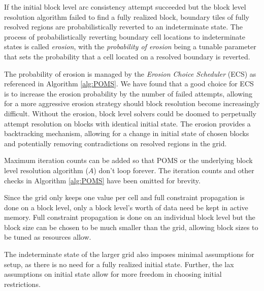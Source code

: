If the initial block level arc consistency attempt succeeded but the block level resolution
algorithm failed to find a fully realized block,
boundary tiles of fully resolved regions are probabilistically reverted to an indeterminate state.
The process of probabilistically reverting boundary cell locations to indeterminate states is called \textit{erosion},
with the \textit{probability of erosion} being a tunable parameter that sets the probability that a cell located on a resolved boundary
is reverted.

The probability of erosion is managed by the \textit{Erosion Choice Scheduler} (ECS) as referenced in Algorithm \ref{alg:POMS}.
We have found that a good choice for ECS is to increase the erosion probability by the number of failed attempts, allowing
for a more aggressive erosion strategy should block resolution become increasingly difficult.
Without the erosion, block level solvers could be doomed
to perpetually attempt resolution on blocks with identical initial state.
The erosion provides a backtracking mechanism, allowing for a change in initial state
of chosen blocks and potentially removing contradictions on resolved regions in the grid.

Maximum iteration counts can be added so that POMS or the underlying block level resolution
algorithm ($A$) don't loop forever.
The iteration counts and other checks in Algorithm \ref{alg:POMS} have been omitted for brevity.


Since the grid only keeps one value per cell and full constraint propagation is done
on a block level, only a block level's worth of data need be kept in active memory.
Full constraint propagation is done on an individual block level but the block size can be
chosen to be much smaller than the grid, allowing block sizes to be tuned as resources allow.


The indeterminate state of the larger grid also imposes minimal assumptions for setup,
as there is no need for a fully realized initial state.
Further, the lax assumptions on initial state allow for more freedom
in choosing initial restrictions.



